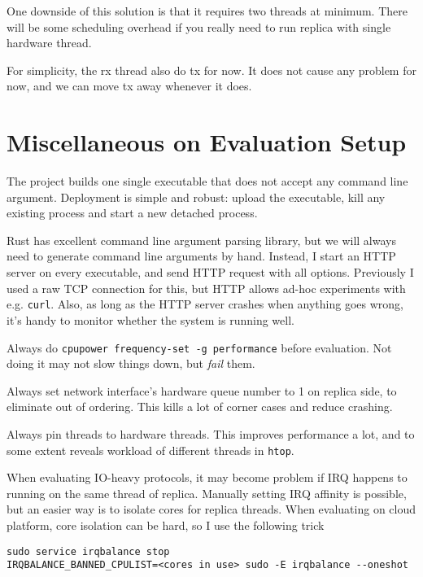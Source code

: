 \documentclass[acmsmall, nonacm, screen]{acmart}
\begin{document}
One downside of this solution is that it requires two threads at minimum.
There will be some scheduling overhead if you really need to run replica with single hardware thread.

For simplicity, the rx thread also do tx for now.
It does not cause any problem for now, and we can move tx away whenever it does.

\section{Miscellaneous on Evaluation Setup}

The project builds one single executable that does not accept any command line argument.
Deployment is simple and robust: upload the executable, kill any existing process and start a new detached process.

Rust has excellent command line argument parsing library, but we will always need to generate command line arguments by hand.
Instead, I start an HTTP server on every executable, and send HTTP request with all options.
Previously I used a raw TCP connection for this, but HTTP allows ad-hoc experiments with e.g. \texttt{curl}.
Also, as long as the HTTP server crashes when anything goes wrong, it's handy to monitor whether the system is running well.

Always do \verb|cpupower frequency-set -g performance| before evaluation.
Not doing it may not slow things down, but \emph{fail} them.

Always set network interface's hardware queue number to 1 on replica side, to eliminate out of ordering.
This kills a lot of corner cases and reduce crashing.

Always pin threads to hardware threads.
This improves performance a lot, and to some extent reveals workload of different threads in \texttt{htop}.

When evaluating IO-heavy protocols, it may become problem if IRQ happens to running on the same thread of replica.
Manually setting IRQ affinity is possible, but an easier way is to isolate cores for replica threads.
When evaluating on cloud platform, core isolation can be hard, so I use the following trick

\begin{verbatim}
sudo service irqbalance stop
IRQBALANCE_BANNED_CPULIST=<cores in use> sudo -E irqbalance --oneshot
\end{verbatim}
\end{document}
